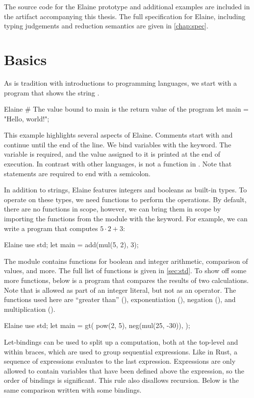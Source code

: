 The source code for the Elaine prototype and additional examples are included in the artifact accompanying this thesis. The full specification for Elaine, including typing judgements and reduction semantics are given in \cref{chap:spec}.

\section{Basics}

As is tradition with introductions to programming languages, we start with a program that shows the string .

\begin{lst}{Elaine}
# The value bound to main is the return value of the program
let main = "Hello, world!";
\end{lst}
%
This example highlights several aspects of Elaine. Comments start with \el{#} and continue until the end of the line. We bind variables with the  keyword. The  variable is required, and the value assigned to it is printed at the end of execution. In contrast with other languages,  is not a function in . Note that statements are required to end with a semicolon.

In addition to strings, Elaine features integers and booleans as built-in types. To operate on these types, we need functions to perform the operations. By default, there are no functions in scope, however, we can bring them in scope by importing the functions from the  module with the  keyword. For example, we can write a program that computes $5 \cdot 2 + 3$:

\begin{lst}{Elaine}
use std;
let main = add(mul(5, 2), 3);
\end{lst}
%
The  module contains functions for boolean and integer arithmetic, comparison of values, and more. The full list of functions is given in \cref{sec:std}. To show off some more functions, below is a program that compares the results of two calculations. Note that \el{-} is allowed as part of an integer literal, but not as an operator. The functions used here are ``greater than'' (), exponentiation (), negation (), and multiplication ().

\begin{lst}{Elaine}
use std;
let main = gt(
    pow(2, 5),
    neg(mul(25, -30)),
);
\end{lst}
%
Let-bindings can be used to split up a computation, both at the top-level and within braces, which are used to group sequential expressions. Like in Rust, a sequence of expressions evaluates to the last expression. Expressions are only allowed to contain variables that have been defined above the expression, so the order of bindings is significant. This rule also disallows recursion. Below is the same comparison written with some bindings.

